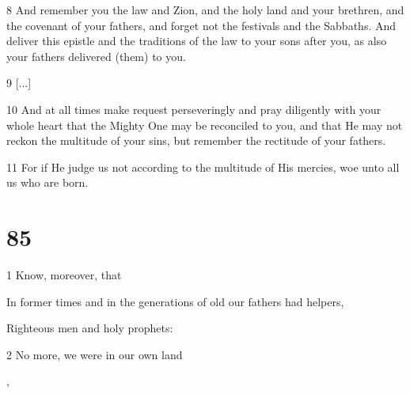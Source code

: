 \par 8 And remember you the law and Zion, and the holy land and your brethren, and the covenant of your fathers, and forget not the festivals and the Sabbaths. And deliver this epistle and the traditions of the law to your sons after you, as also your fathers delivered (them) to you. 

\par 9 [...]

\par 10 And at all times make request perseveringly and pray diligently with your whole heart that the Mighty One may be reconciled to you, and that He may not reckon the multitude of your sins, but remember the rectitude of your fathers.

\par 11 For if He judge us not according to the multitude of His mercies, woe unto all us who are born.

\chapter{85}

\par 1 Know, moreover, that

\par In former times and in the generations of old our fathers had helpers, 

\par Righteous men and holy prophets:

\par 2 No more, we were in our own land

\par [And they helped us when we sinned],

